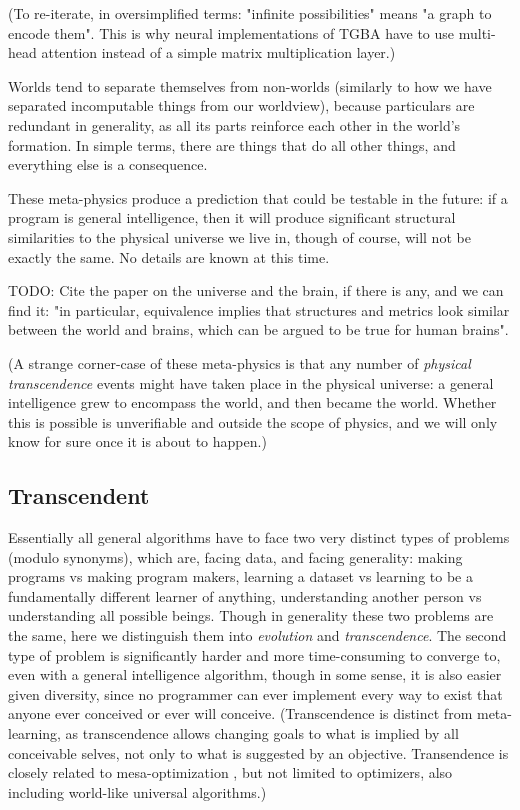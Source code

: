\documentclass{article}
\begin{document}
(To re-iterate, in oversimplified terms: "infinite possibilities" means "a graph to encode them". This is why neural implementations of TGBA have to use multi-head attention instead of a simple matrix multiplication layer.)

Worlds tend to separate themselves from non-worlds (similarly to how we have separated incomputable things from our worldview), because particulars are redundant in generality, as all its parts reinforce each other in the world's formation. In simple terms, there are things that do all other things, and everything else is a consequence.

These meta-physics produce a prediction that could be testable in the future: if a program is general intelligence, then it will produce significant structural similarities to the physical universe we live in, though of course, will not be exactly the same. No details are known at this time.

    TODO: Cite the paper on the universe and the brain, if there is any, and we can find it: "in particular, equivalence implies that structures and metrics look similar between the world and brains, which can be argued to be true for human brains".

(A strange corner-case of these meta-physics is that any number of \textit{physical transcendence} events might have taken place in the physical universe: a general intelligence grew to encompass the world, and then became the world. Whether this is possible is unverifiable and outside the scope of physics, and we will only know for sure once it is about to happen.)

\subsection{Transcendent}

Essentially all general algorithms have to face two very distinct types of problems (modulo synonyms), which are, facing data, and facing generality: making programs vs making program makers, learning a dataset vs learning to be a fundamentally different learner of anything, understanding another person vs understanding all possible beings. Though in generality these two problems are the same, here we distinguish them into \textit{evolution} and \textit{transcendence}. The second type of problem is significantly harder and more time-consuming to converge to, even with a general intelligence algorithm, though in some sense, it is also easier given diversity, since no programmer can ever implement every way to exist that anyone ever conceived or ever will conceive. (Transcendence is distinct from meta-learning, as transcendence allows changing goals to what is implied by all conceivable selves, not only to what is suggested by an objective. Transendence is closely related to mesa-optimization \cite{hubinger2019risks}, but not limited to optimizers, also including world-like universal algorithms.)
\end{document}
